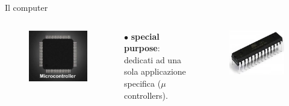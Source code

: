 \begin{frame}
\begin{block}{Il computer}
\begin{columns}
		\end{columns}
		 
		\begin{columns}						
			\begin{figure}[!htbp]
				\centering 
				\includegraphics[width=0.7\linewidth]{images/2_le_architetture/microcontroller.jpeg}
			\end{figure}
			
			$\bullet$ \textbf{special purpose}:\\dedicati ad una sola applicazione specifica  ($\mu$controllers).
			
			\begin{figure}[!htbp]
				\centering
				\advance\leftskip-0.5cm
				\includegraphics[width=1.0\linewidth]{images/2_le_architetture/microcontroller.png}
			\end{figure}
			
		\end{columns}
		
	\end{block}
	
	
\end{frame}



